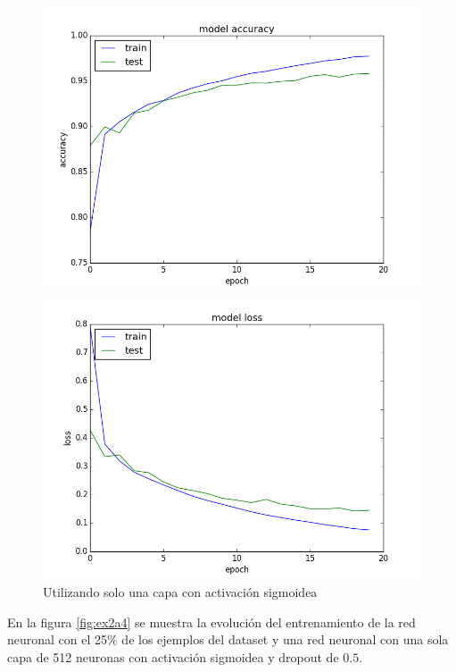 \documentclass[11pt,spanish]{article}
\begin{document}
\begin{figure}[tpb]
\centering
\begin{minipage}{.5\textwidth}
  \centering
  \includegraphics[width=1\linewidth]{../ex2a3_acc.png}
\end{minipage}%
\begin{minipage}{.5\textwidth}
  \centering
  \includegraphics[width=1\linewidth]{../ex2a3_loss.png}
\end{minipage}
\caption{Utilizando solo una capa con activación sigmoidea}
\label{fig:ex2a3}
\end{figure}

En la figura \ref{fig:ex2a4} se muestra la evolución del entrenamiento de la red neuronal con el 25\% de los ejemplos del dataset y una red neuronal con una sola capa de 512 neuronas con activación sigmoidea y dropout de $0.5$. 
\end{document}
